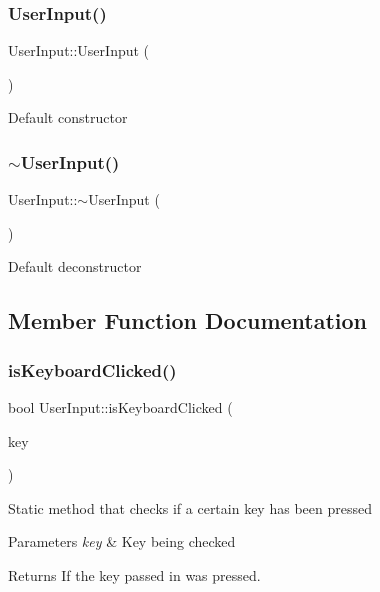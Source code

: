 \subsubsection{\texorpdfstring{UserInput()}{UserInput()}}
{\footnotesize\ttfamily User\+Input\+::\+User\+Input (\begin{DoxyParamCaption}{ }\end{DoxyParamCaption})\hspace{0.3cm}{\ttfamily [default]}}

Default constructor \mbox{\label{class_user_input_aa4db2151dcad8d3a522682aaa784991b}} 
\subsubsection{\texorpdfstring{$\sim$UserInput()}{~UserInput()}}
{\footnotesize\ttfamily User\+Input\+::$\sim$\+User\+Input (\begin{DoxyParamCaption}{ }\end{DoxyParamCaption})\hspace{0.3cm}{\ttfamily [default]}}

Default deconstructor 

\subsection{Member Function Documentation}
\mbox{\label{class_user_input_aa26c28cfd6d9a7d573edbc08fa123ace}} 
\subsubsection{\texorpdfstring{isKeyboardClicked()}{isKeyboardClicked()}}
{\footnotesize\ttfamily bool User\+Input\+::is\+Keyboard\+Clicked (\begin{DoxyParamCaption}\item[{sf\+::\+Keyboard\+::\+Key}]{key }\end{DoxyParamCaption})\hspace{0.3cm}{\ttfamily [static]}}

Static method that checks if a certain key has been pressed 
\begin{DoxyParams}{Parameters}
{\em key} & Key being checked \\
\hline
\end{DoxyParams}
\begin{DoxyReturn}{Returns}
If the key passed in was pressed. 
\end{DoxyReturn}


